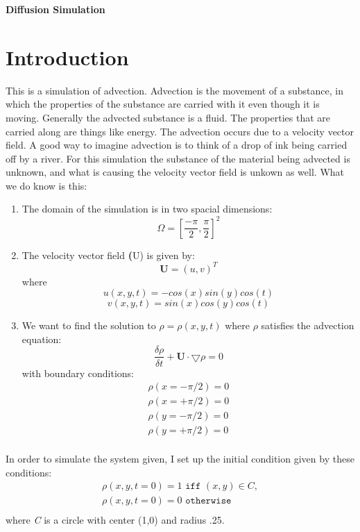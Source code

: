 \documentclass[12pt]{article}
\begin{document}
\centerline{\Large\textbf{Diffusion Simulation}}
\vspace{0cm}


\section{Introduction}\label{sec::Intro}
This is a simulation of advection. Advection is the movement of a substance, in which the properties of the substance are carried with it even though it is moving. Generally the advected substance is a fluid. The properties that are carried along are things like energy. The advection occurs due to a velocity vector field. A good way to imagine advection is to think of a drop of ink being carried off by a river. For this simulation the substance of the material being advected is unknown, and what is causing the velocity vector field is unkown as well. What we do know is this:

\begin{enumerate}

\item The domain of the simulation is in two spacial dimensions:
$$ \Omega=[\frac{-\pi}{2},\frac{\pi}{2}]^2 $$
\item The velocity vector field \textbf(U) is given by:
$$ \textbf{U} = (u,v)^T $$ where $$ u(x,y,t) = -cos(x)sin(y)cos(t) $$ 
$$ v(x,y,t)=sin(x)cos(y)cos(t) $$
\item We want to find the solution to $\rho=\rho(x,y,t)$ where $\rho$ satisfies the advection equation:
$$ \frac{\delta \rho}{\delta t} + \textbf{U}\cdot \bigtriangledown \rho = 0 $$ with boundary conditions:
$$ \begin{aligned}
 \rho(x=-\pi / 2) = 0 \\
 \rho(x=+\pi / 2) = 0 \\
 \rho(y=-\pi / 2) = 0 \\
 \rho(y=+\pi / 2) = 0 \\
 \end{aligned}
 $$
 
\end{enumerate}

In order to simulate the system given, I set up the initial condition given by these conditions:
$$ 
\begin{aligned}
 \rho(x,y,t=0) = 1 \texttt{ iff } (x,y)\in C, \\
 \rho(x,y,t=0) = 0 \texttt{ otherwise} \\
\end{aligned} 
$$
where \emph{C} is a circle with center (1,0) and radius .25.
\end{document}
